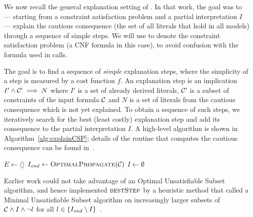 
We now recall the general explanation setting of \citet{ecai/BogaertsGCG20}. 
In that work, the goal was to --- starting from a constraint satisfaction problem and a partial interpretation $I$ --- explain the cautious consequence (the set of all literals that hold in all models) through a sequence of simple steps. 
We will use \formulac to denote the constraint satisfaction problem (a CNF formula in this case), to avoid confusion with the formula \formula used in \omus calls.

The goal is to find a sequence of \textit{simple} explanation steps, where the simplicity of a step is measured by a cost function $f$. 
An explanation step is an implication $I' \wedge \mathcal{C} ' \implies N$ where $I'$ is a set of already derived literals, $\mathcal{C} '$ is a subset of constraints of the input formula $\mathcal{C} $ and $N$ is a set of literals from the cautious consequence which is not yet explained.
To obtain a sequence of such steps, we iteratively search for the best (least costly) explanation step and add its consequence to the partial interpretation $I$. A high-level algorithm is shown in Algorithm~\ref{alg:explainCSP}; details of the \optprop routine that computes the cautious consequence can be found in~\cite{ecai/BogaertsGCG20}.

\begin{algorithm}[ht]
  \caption{$\call{ExplainCSP}(\formulac,f)$}
  \label{alg:explainCSP}
$E \gets \langle \rangle$\;
$I_{\mathit{end}} \gets \textsc{OptimalPropagate}(\mathcal{C} )$\;
$I \gets \emptyset$\;
\;
\end{algorithm}

Earlier work could not take advantage of an Optimal Unsatisfiable Subset algorithm, and hence implemented $\textsc{bestStep}$ by a heuristic method that called a Minimal Unsatisfiable Subset algorithm on increasingly larger subsets of $\mathcal{C} \wedge I \wedge \lnot l$ for all $l \in \{I_{\mathit{end}} \setminus I\}$~\cite{ecai/BogaertsGCG20}.


